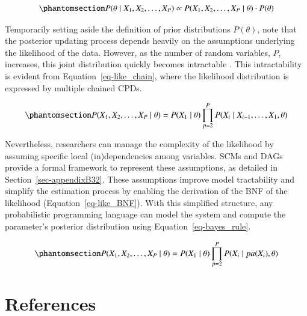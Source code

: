 \documentclass[
  authoryear,
  review,
  1p]{elsarticle}
\begin{document}
\begin{equation}\phantomsection\label{eq-prop_rule}{
P(\theta \mid X_{1}, X_{2}, \dots, X_{P}) \propto P(X_{1}, X_{2}, \dots, X_{P}\mid \theta) \cdot P(\theta)
}\end{equation}

Temporarily setting aside the definition of prior distributions
\(P(\theta)\), note that the posterior updating process depends heavily
on the assumptions underlying the likelihood of the data. However, as
the number of random variables, \(P\), increases, this joint
distribution quickly becomes intractable \citep{Neal_2020}. This
intractability is evident from Equation~\ref{eq-like_chain}, where the
likelihood distribution is expressed by multiple chained CPDs.

\begin{equation}\phantomsection\label{eq-like_chain}{
P(X_{1}, X_{2}, \dots, X_{P} \mid \theta) = P(X_{1} \mid \theta) \prod^{P}_{p=2} P(X_{i} \mid X_{i-1}, \dots, X_{1}, \theta )
}\end{equation}

Nevertheless, researchers can manage the complexity of the likelihood by
assuming specific local (in)dependencies among variables. SCMs and DAGs
provide a formal framework to represent these assumptions, as detailed
in Section~\ref{sec-appendixB32}. These assumptions improve model
tractability and simplify the estimation process by enabling the
derivation of the BNF of the likelihood (Equation~\ref{eq-like_BNF}).
With this simplified structure, any probabilistic programming language
can model the system and compute the parameter's posterior distribution
using Equation~\ref{eq-bayes_rule}.

\begin{equation}\phantomsection\label{eq-like_BNF}{
P(X_{1}, X_{2}, \dots, X_{P} \mid \theta) = P(X_{1} \mid \theta) \prod^{P}_{p=2} P(X_{i} \mid pa(X_{i}), \theta )
}\end{equation}

\newpage{}

\section*{References}\label{references}

\renewcommand{\bibsection}{}

\end{document}

